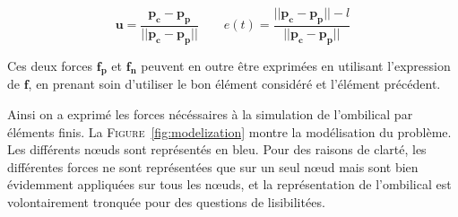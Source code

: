 \begin{description}
\begin{itemize}
        $$\mathbf{u} = \frac{\mathbf{p_c} - \mathbf{p_p}}{||\mathbf{p_c} - \mathbf{p_p}||} \qquad e(t) = \frac{||\mathbf{p_c} - \mathbf{p_p}|| - l}{||\mathbf{p_c} - \mathbf{p_p}||}$$
        
        Ces deux forces $\mathbf{f_p}$ et $\mathbf{f_n}$ peuvent en outre être exprimées en utilisant l'expression de $\mathbf{f}$, en prenant soin d'utiliser le bon élément considéré et l'élément précédent.
    \end{itemize}
    \end{description}

    Ainsi on a exprimé les forces nécéssaires à la simulation de l'ombilical par éléments finis. La \textsc{Figure}~\ref{fig:modelization} montre la modélisation du problème. Les différents n\oe uds sont représentés en bleu. Pour des raisons de clarté, les différentes forces ne sont représentées que sur un seul n\oe ud mais sont bien évidemment appliquées sur tous les n\oe uds, et la représentation de l'ombilical est volontairement tronquée pour des questions de lisibilitées.

